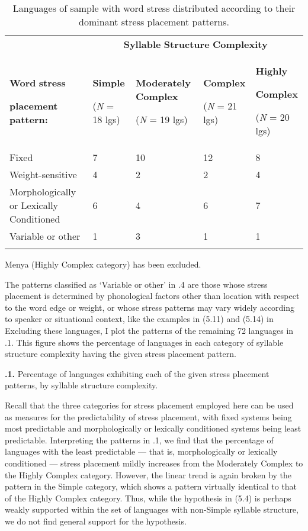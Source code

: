 \begin{table}
\begin{tabularx}{\textwidth}{XXXXX}
\lsptoprule
 & \multicolumn{4}{c}{ \textbf{Syllable} \textbf{Structure} \textbf{Complexity}}\\
{ \textbf{Word} \textbf{stress} }

 \textbf{placement} \textbf{pattern:} & { \textbf{Simple}}

 (\textit{N} = 18 lgs) & { \textbf{Moderately} \textbf{Complex}}

 (\textit{N} = 19 lgs) & { \textbf{Complex}}

 (\textit{N} = 21 lgs) & { \textbf{Highly} }

{ \textbf{Complex}}

 (\textit{N} = 20 lgs)\\
 Fixed & 7 & 10 & 12 & 8\\
 Weight-sensitive & 4 & 2 & 2 & 4\\
 Morphologically or Lexically Conditioned & 6 & 4 & 6 & 7\\
 Variable or other & 1 & 3 & 1 & 1\\
\lspbottomrule
\end{tabularx}
\caption{\label{5.4}Languages of sample with word stress distributed according to their dominant stress placement patterns.}Menya (Highly Complex category) has been excluded.
\end{table}

  The patterns classified as ‘Variable or other’ in .4 are those whose stress placement is determined by phonological factors other than location with respect to the word edge or weight, or whose stress patterns may vary widely according to speaker or situational context, like the examples in (5.11) and (5.14) in  Excluding these languages, I plot the patterns of the remaining 72 languages in .1. This figure shows the percentage of languages in each category of syllable structure complexity having the given stress placement pattern.

\textbf{.1.} Percentage of languages exhibiting each of the given stress placement patterns, by syllable structure complexity.

  Recall that the three categories for stress placement employed here can be used as measures for the predictability of stress placement, with fixed systems being most predictable and morphologically or lexically conditioned systems being least predictable. Interpreting the patterns in .1, we find that the percentage of languages with the least predictable — that is, morphologically or lexically conditioned — stress placement mildly increases from the Moderately Complex to the Highly Complex category. However, the linear trend is again broken by the pattern in the Simple category, which shows a pattern virtually identical to that of the Highly Complex category. Thus, while the hypothesis in (5.4) is perhaps weakly supported within the set of languages with non-Simple syllable structure, we do not find general support for the hypothesis.

